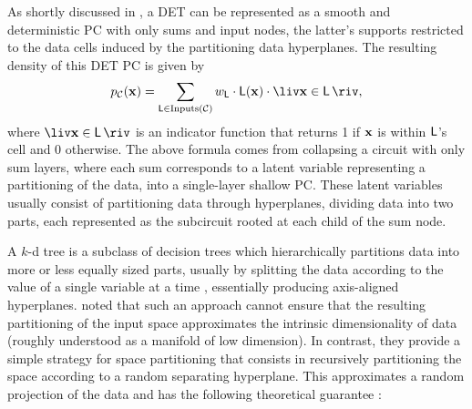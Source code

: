 As shortly discussed in , a DET can be represented as a smooth and deterministic PC
with only sums and input nodes, the latter's supports restricted to the data cells induced by the
partitioning data hyperplanes. The resulting density of this DET PC is given by
\begin{equation}
  p_\mathcal{C}(\set{x})=\sum_{\Leaf\in\operatorname{Inputs}(\mathcal{C})}w_{\Leaf}\cdot\Leaf(\set{x})\cdot\liv\set{x}\in\Leaf\riv,
\end{equation}
where $\liv\set{x}\in\Leaf\riv$ is an indicator function that returns 1 if $\mathbf{x}$ is within
$\operatorname{\textup{\textsf{L}}}$'s cell and 0 otherwise. The above formula comes from collapsing a circuit with only sum
layers, where each sum corresponds to a latent variable representing a partitioning of the data,
into a single-layer shallow PC. These latent variables usually consist of partitioning data through
hyperplanes, dividing data into two parts, each represented as the subcircuit rooted at each child
of the sum node.

A $k$-d tree is a subclass of decision trees which hierarchically partitions data into more or less
equally sized parts, usually by splitting the data according to the value of a single variable at a
time \citep{bentley75,hang19,ho95}, essentially producing axis-aligned hyperplanes.
\citet{dasgupta08b} noted that such an approach cannot ensure that the resulting partitioning of
the input space approximates the intrinsic dimensionality of data (roughly understood as a manifold
of low dimension). In contrast, they provide a simple strategy for space partitioning that consists
in recursively partitioning the space according to a random separating hyperplane. This
approximates a random projection of the data and has the following theoretical guarantee
\citep{dasgupta08b}:

